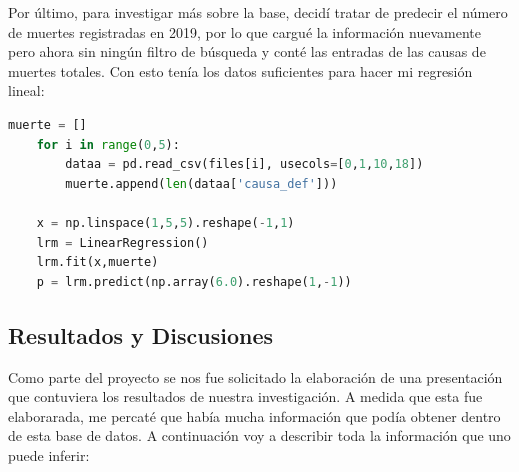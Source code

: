 \documentclass[12pt,letterpaper]{article}
\begin{document}
Por último, para investigar más sobre la base, decidí tratar de predecir el número de muertes registradas en 2019, por lo que cargué la información nuevamente pero ahora sin ningún filtro de búsqueda y conté las entradas de las causas de muertes totales. Con esto tenía los datos suficientes para hacer mi regresión lineal: 
\scriptsize{\begin{lstlisting}[language=Python]
    muerte = []
    for i in range(0,5):
        dataa = pd.read_csv(files[i], usecols=[0,1,10,18])
        muerte.append(len(dataa['causa_def']))
        
    x = np.linspace(1,5,5).reshape(-1,1)    
    lrm = LinearRegression()
    lrm.fit(x,muerte)
    p = lrm.predict(np.array(6.0).reshape(1,-1))
\end{lstlisting}}
\normalsize{
\subsection*{\small{Resultados y Discusiones}}
Como parte del proyecto se nos fue solicitado la elaboración de una presentación que contuviera los resultados de nuestra investigación. A medida que esta fue elaborarada, me percaté que había mucha información que podía obtener dentro de esta base de datos. A continuación voy a describir toda la información que uno puede inferir:} 
\end{document}
